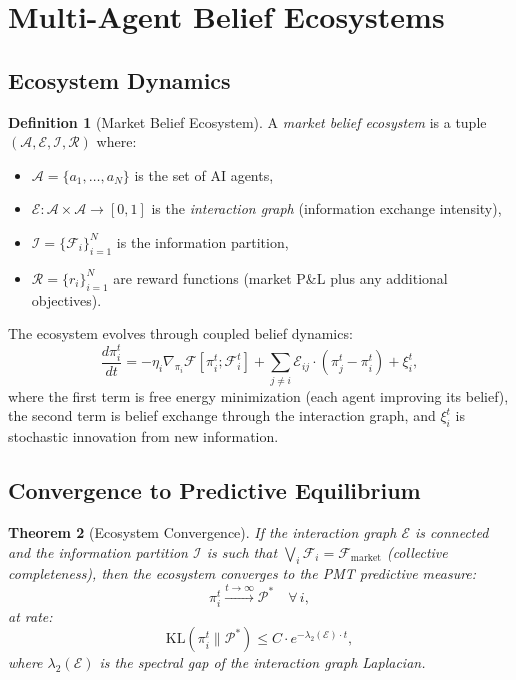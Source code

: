 \documentclass[12pt,a4paper]{article}
\newtheorem{theorem}{Theorem}[section]
\theoremstyle{definition}
\newtheorem{definition}[theorem]{Definition}
\newcommand{\F}{\mathcal{F}}
\newcommand{\PP}{\mathcal{P}}
\newcommand{\KL}{\mathrm{KL}}
\begin{document}
\section{Multi-Agent Belief Ecosystems}\label{sec:ecosystem}

\subsection{Ecosystem Dynamics}

\begin{definition}[Market Belief Ecosystem]\label{def:ecosystem}
A \emph{market belief ecosystem} is a tuple $(\mathcal{A}, \mathcal{E}, \mathcal{I}, \mathcal{R})$ where:
\begin{itemize}
  \item $\mathcal{A} = \{a_1, \ldots, a_N\}$ is the set of AI agents,
  \item $\mathcal{E}: \mathcal{A} \times \mathcal{A} \to [0,1]$ is the \emph{interaction graph} (information exchange intensity),
  \item $\mathcal{I} = \{\F_i\}_{i=1}^N$ is the information partition,
  \item $\mathcal{R} = \{r_i\}_{i=1}^N$ are reward functions (market P\&L plus any additional objectives).
\end{itemize}
\end{definition}

The ecosystem evolves through coupled belief dynamics:
\begin{equation}\label{eq:ecosystem-dynamics}
  \frac{d\pi_i^t}{dt} = -\eta_i \nabla_{\pi_i} \F[\pi_i^t; \F_i^t] + \sum_{j \neq i} \mathcal{E}_{ij} \cdot (\pi_j^t - \pi_i^t) + \xi_i^t,
\end{equation}
where the first term is free energy minimization (each agent improving its belief), the second term is belief exchange through the interaction graph, and $\xi_i^t$ is stochastic innovation from new information.

\subsection{Convergence to Predictive Equilibrium}

\begin{theorem}[Ecosystem Convergence]\label{thm:convergence}
If the interaction graph $\mathcal{E}$ is connected and the information partition $\mathcal{I}$ is such that $\bigvee_i \F_i = \F_{\mathrm{market}}$ (collective completeness), then the ecosystem converges to the PMT predictive measure:
\begin{equation}
  \pi_i^t \xrightarrow{t \to \infty} \PP^* \quad \forall\, i,
\end{equation}
at rate:
\begin{equation}
  \KL(\pi_i^t \| \PP^*) \leq C \cdot e^{-\lambda_2(\mathcal{E}) \cdot t},
\end{equation}
where $\lambda_2(\mathcal{E})$ is the spectral gap of the interaction graph Laplacian.
\end{theorem}
\end{document}
